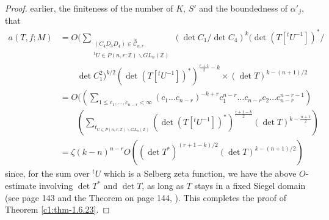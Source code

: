 \begin{proof}
earlier, the finiteness of the number of $K$, $S'$ and the boundedness
of $\alpha'_{j}$, that
\begin{align*}
a(T,f;M) &= O(\sum_{\substack{(C_{4}D_{3}D_{4})\in
    \overset{\approx}{\mathscr{C}}_{n,r}\\ {}^{t}U\in
    P(n,r;\mathbb{Z})\backslash GL_{n}(\mathbb{Z})}}(\det C_{1}/\det
C_{4})^{k}(\det (T[{}^{t}U^{-1}])^{\ast}/\\
&\qquad\det C^{2}_{1})^{k/2}(\det
(T[{}^{t}U^{-1}])^{\ast})^{\frac{r+1}{2}-k}
\times(\det T)^{k-(n+1)/2}\\
&= O((\sum_{1\leq c_{1},\ldots,c_{n-r}<\infty} (c_{1}\ldots
c_{n-r})^{-k+r}c^{n-r}_{1}\ldots c_{n-r}c_{2}\ldots
c^{n-r-1}_{n-r})\\
&\qquad (\sum_{t_{U\in P(n,r;\mathbb{Z})\backslash
    GL_{n}(\mathbb{Z})}}(\det
(T[{}^{t}U^{-1}])^{\ast})^{\frac{r+1-k}{2}}(\det
T)^{k-\frac{n+1}{2}})\\
&= \zeta(k-n)^{n-r}O((\det T^{\ast})^{(r+1-k)/2}(\det T)^{k-(n+1)/2}) 
\end{align*}
since, for the sum over ${}^{t}U$ which is a Selberg zeta function, we
have the above $O$-estimate involving $\det T^{\ast}$ and $\det T$, as
long as $T$ stays in a fixed Siegel domain (see page 143 and the
Theorem on page 144, \cite{key17}). This completes the proof of Theorem
\ref{c1:thm-1.6.23}. 
\end{proof}

